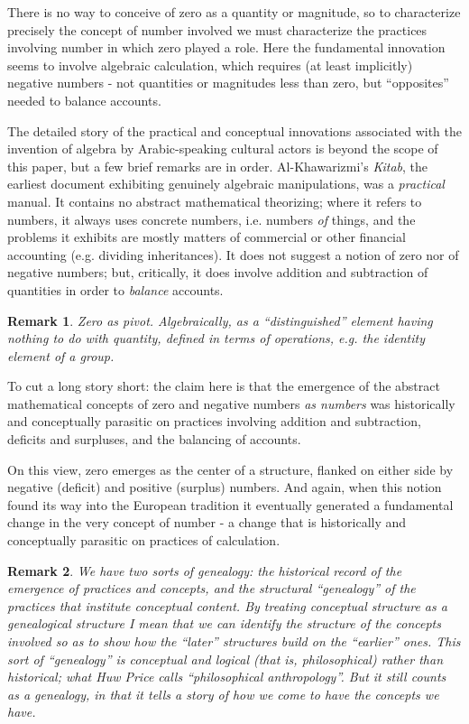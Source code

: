 \documentclass[11pt,twoside]{article}
\newtheorem{remark}{Remark}
\begin{document}
There is no way to conceive of zero as a quantity or magnitude, so to
characterize precisely the concept of number involved we must
characterize the practices involving number in which zero played a
role.  Here the fundamental innovation seems to involve algebraic
calculation, which requires (at least implicitly) negative numbers -
not quantities or magnitudes less than zero, but ``opposites'' needed
to balance accounts.

The detailed story of the practical and conceptual innovations
associated with the invention of algebra by Arabic-speaking cultural
actors is beyond the scope of this paper, but a few brief remarks are
in order.  Al-Khawarizmi's \textit{Kitab}, the earliest document
exhibiting genuinely algebraic manipulations, was a \textit{practical}
manual.  It contains no abstract mathematical theorizing; where it
refers to numbers, it always uses concrete numbers, i.e. numbers
\textit{of} things, and the problems it exhibits are mostly matters of
commercial or other financial accounting (e.g. dividing inheritances).
It does not suggest a notion of zero nor of negative numbers; but,
critically, it does involve addition and subtraction of quantities in
order to \textit{balance} accounts.

\begin{remark}
  Zero as pivot.  Algebraically, as a ``distinguished'' element having
  nothing to do with quantity, defined in terms of operations,
  e.g. the identity element of a group.
\end{remark}

To cut a long story short: the claim here is that the emergence of the
abstract mathematical concepts of zero and negative numbers \textit{as
  numbers} was historically and conceptually parasitic on practices
involving addition and subtraction, deficits and surpluses, and the
balancing of accounts.

On this view, zero emerges as the center of a structure, flanked on
either side by negative (deficit) and positive (surplus) numbers.  And
again, when this notion found its way into the European tradition it
eventually generated a fundamental change in the very concept of
number - a change that is historically and conceptually parasitic on
practices of calculation.

\begin{remark}
We have two sorts of genealogy: the historical record of the emergence
of practices and concepts, and the structural ``genealogy'' of the
practices that institute conceptual content.  By treating conceptual
structure as a genealogical structure I mean that we can identify the
structure of the concepts involved so as to show how the ``later''
structures build on the ``earlier'' ones.  This sort of ``genealogy''
is conceptual and logical (that is, philosophical) rather than
historical; what Huw Price calls ``philosophical anthropology''.  But
it still counts as a genealogy, in that it tells a story of how we
come to have the concepts we have.
\end{remark}
\end{document}
